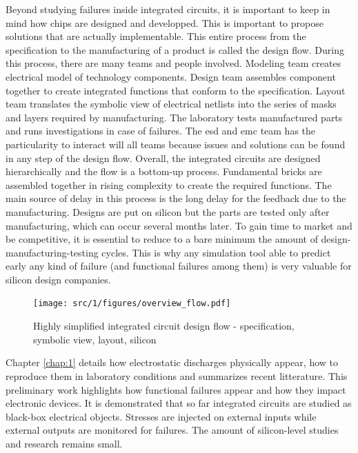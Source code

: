 Beyond studying failures inside integrated circuits, it is important to keep in mind how chips are designed and developped.
This is important to propose solutions that are actually implementable.
This entire process from the specification to the manufacturing of a product is called the design flow.
During this process, there are many teams and people involved.
Modeling team creates electrical model of technology components.
Design team assembles component together to create integrated functions that conform to the specification.
Layout team translates the symbolic view of electrical netlists into the series of masks and layers required by manufacturing.
The laboratory tests manufactured parts and runs investigations in case of failures.
The \gls{esd} and \gls{emc} team has the particularity to interact will all teams because issues and solutions can be found in any step of the design flow.
Overall, the integrated circuits are designed hierarchically and the flow is a bottom-up process.
Fundamental bricks are assembled together in rising complexity to create the required functions.
The main source of delay in this process is the long delay for the feedback due to the manufacturing.
Designs are put on silicon but the parts are tested only after manufacturing, which can occur several months later.
To gain time to market and be competitive, it is essential to reduce to a bare minimum the amount of design-manufacturing-testing cycles.
This is why any simulation tool able to predict early any kind of failure (and functional failures among them) is very valuable for silicon design companies.

\begin{figure}[!h]
  \centering
  \texttt{[image: src/1/figures/overview\_flow.pdf]}
  \caption{Highly simplified integrated circuit design flow - specification, symbolic view, layout, silicon}
  \label{fig:ic-design-flow}
\end{figure}

%
Chapter \ref{chap:1} details how electrostatic discharges physically appear, how to reproduce them in laboratory conditions and summarizes recent litterature.
This preliminary work highlights how functional failures appear and how they impact electronic devices.
It is demonstrated that so far integrated circuits are studied as black-box electrical objects.
Stresses are injected on external inputs while external outputs are monitored for failures.
The amount of silicon-level studies and research remains small.

